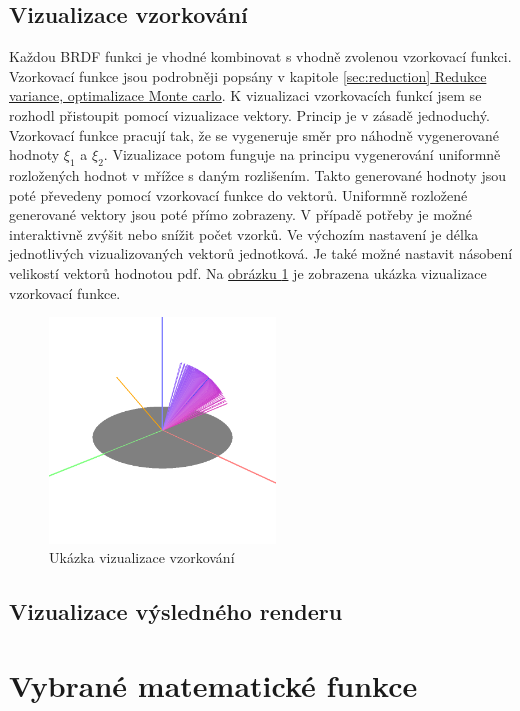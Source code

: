 \documentclass[czech,master]{diploma}
\newcommand{\randU}{\xi_{1}}
\newcommand{\randV}{\xi_{2}}
\begin{document}
\section{Vizualizace vzorkování}
Každou BRDF funkci je vhodné kombinovat s vhodně zvolenou vzorkovací funkci. Vzorkovací funkce jsou podrobněji popsány v kapitole \hyperref[sec:reduction]{\ref{sec:reduction} Redukce variance, optimalizace Monte carlo}. K vizualizaci vzorkovacích funkcí jsem se rozhodl přistoupit pomocí vizualizace vektory. Princip je v zásadě jednoduchý. Vzorkovací funkce pracují tak, že se vygeneruje směr pro náhodně vygenerované hodnoty $\randU$ a $\randV$. Vizualizace potom funguje na principu vygenerování uniformně rozložených hodnot v mřížce s daným rozlišením. Takto generované hodnoty jsou poté převedeny pomocí vzorkovací funkce do vektorů. Uniformně rozložené generované vektory jsou poté přímo zobrazeny. V případě potřeby je možné interaktivně zvýšit nebo snížit počet vzorků. Ve výchozím nastavení je délka jednotlivých vizualizovaných vektorů jednotková. Je také možné nastavit násobení velikostí vektorů hodnotou pdf. Na \hyperref[fig:samplingExample]{obrázku \ref{fig:samplingExample}} je zobrazena ukázka vizualizace vzorkovací funkce.

\begin{figure}
  \centering
  \includegraphics[width=6cm]{Figures/samplingExample.png}
  \caption{Ukázka vizualizace vzorkování}%
  \label{fig:samplingExample}%
\end{figure}


\section{Vizualizace výsledného renderu}

\clearpage
\chapter{Vybrané matematické funkce}
\end{document}

